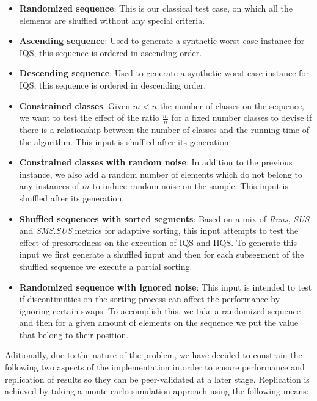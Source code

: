 \begin{itemize}
        
    \item{\textbf{Randomized sequence}: 
    This is our classical test case, on which all the elements are shuffled without any special criteria.}

    \item{\textbf{Ascending sequence}: 
    Used to generate a synthetic worst-case instance for IQS, this sequence is ordered in ascending order.}

    \item{\textbf{Descending sequence}: 
    Used to generate a synthetic worst-case instance for IQS, this sequence is ordered in descending order.}

    \item{\textbf{Constrained classes}: 
    Given $m < n$ the number of classes on the sequence, we want to test the effect of the ratio $\frac{m}{n}$ for a fixed number classes to devise if there is a relationship between the number of classes and the running time of the algorithm. This input is shuffled after its generation.}

    \item{\textbf{Constrained classes with random noise}: 
    In addition to the previous instance, we also add a random number of elements which do not belong to any instances of $m$ to induce random noise on the sample. This input is shuffled after its generation.}

    \item{\textbf{Shuffled sequences with sorted segments}: 
    Based on a mix of \textit{Runs}, \textit{SUS} and \textit{SMS.SUS} metrics for adaptive sorting, this input attempts to test the effect of presortedness on the execution of IQS and IIQS. To generate this input we first generate a shuffled input and then for each subsegment of the shuffled sequence we execute a partial sorting.}

    \item{\textbf{Randomized sequence with ignored noise}: 
    This input is intended to test if discontinuities on the sorting process can affect the performance by ignoring certain swaps. To accomplish this, we take a randomized sequence and then for a given amount of elements on the sequence we put the value that belong to their position.}
\end{itemize}

Aditionally, due to the nature of the problem, we have decided to constrain the following two aspects of the implementation in order to ensure performance and replication of results so they can be peer-validated at a later stage. Replication is achieved by taking a monte-carlo simulation approach using the following means:

